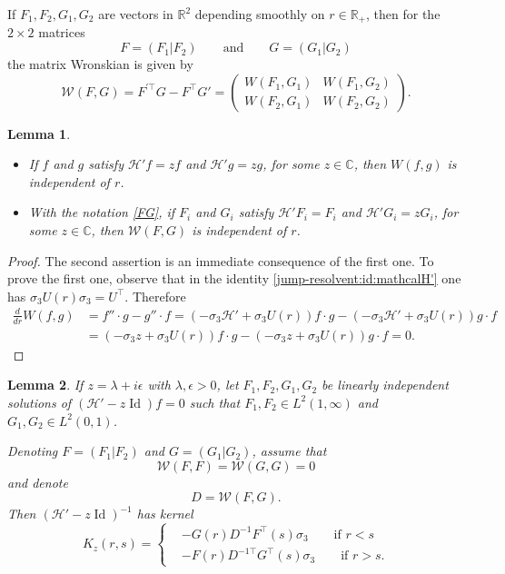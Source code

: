 \documentclass[11 pt]{amsart}
\newtheorem{lem}{Lemma}[section]
\theoremstyle{definition}
\theoremstyle{remark}
\numberwithin{equation}{section}
\begin{document}
If $F_1,F_2,G_1,G_2$ are vectors in $\mathbb{R}^2$ depending smoothly on $r \in \mathbb{R}_+$, then for the $2\times 2$ matrices 
\begin{equation}
\label{FG}
F = (F_1 | F_2) \qquad \mbox{and} \qquad G = (G_1|G_2)
\end{equation}
the matrix Wronskian is given by
$$
\mathcal{W}(F,G) = F^{' \top} G - F^{\top} G' = 
\begin{pmatrix} W(F_1,G_1) & W(F_1,G_2) \\ W(F_2,G_1) & W(F_2,G_2) \end{pmatrix}.
$$

\begin{lem}
\label{lemwronskian}
\begin{itemize}
    \item[(i)]If $f$ and $g$ satisfy $\mathcal{H}' f = zf$ and $\mathcal{H}' g = zg$, for some $z \in \mathbb{C}$, then $W(f,g)$ is independent of $r$.
    \item[(ii)] With the notation \eqref{FG}, if $F_i$ and $G_i$ satisfy $\mathcal{H}' F_i = F_i$ and $\mathcal{H}' G_i = zG_i$, for some $z \in \mathbb{C}$, then $\mathcal{W}(F,G)$ is independent of $r$.
\end{itemize}
\end{lem}

\begin{proof} The second assertion is an immediate consequence of the first one. To prove the first one, observe that in the identity \eqref{jump-resolvent:id:mathcalH'} one has $\sigma_3 U(r) \sigma_3 = U^\top$. Therefore
\begin{align*}
\frac{d}{dr} W(f,g) & = f'' \cdot g - g'' \cdot f
= (-\sigma_3 \mathcal{H}' + \sigma_3 U(r)) f \cdot g - (-\sigma_3 \mathcal{H}' + \sigma_3 U(r)) g \cdot f \\
& = (-\sigma_3 z + \sigma_3 U(r)) f \cdot g - (-\sigma_3 z + \sigma_3 U(r)) g \cdot f = 0.
\end{align*}

\end{proof}


\begin{lem} \label{lemresolventz} If $z = \lambda + i \epsilon$ with $\lambda,\epsilon>0$, let $F_1,F_2,G_1,G_2$ be linearly independent solutions of $(\mathcal{H}' - z \operatorname{Id}) f =0$ such that $F_1,F_2 \in L^2(1,\infty)$ and $G_1,G_2 \in L^2(0,1)$. 

Denoting $F=(F_1|F_2)$ and $G = (G_1|G_2)$, assume that
$$
\mathcal{W}(F,F) = \mathcal{W}(G,G) = 0
$$
and denote
$$
D = \mathcal{W}(F,G).
$$
Then $(\mathcal{H}'- z \operatorname{Id})^{-1}$ has kernel
$$
K_z(r,s) =
\begin{cases}
& - G(r) D^{-1} F^\top(s) \sigma_3 \qquad \mbox{if $r<s$} \\
& - F(r) D^{-1 \top} G^\top(s) \sigma_3 \qquad \mbox{if $r>s$}. 
\end{cases}
$$

\end{lem}
\end{document}
